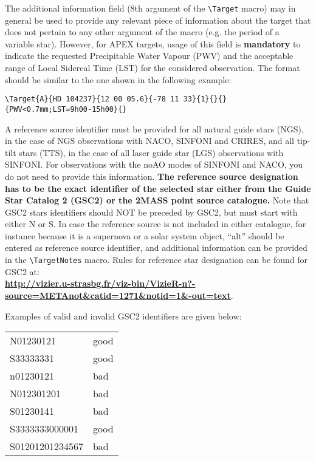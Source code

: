 \documentclass{article}
\begin{document}
The additional information field (8th argument of the \verb|\Target|
macro) may in general be used to provide any relevant piece of
information about the target that does not pertain to any other
argument of the macro (e.g. the period of a variable star). However,
for APEX targets, usage of this field is {\bf mandatory} to indicate the
requested Precipitable Water Vapour (PWV) and the acceptable range of
Local Sidereal Time (LST) for the considered observation. The format
should be similar to the one shown in the following example:
\begin{verbatim}
\Target{A}{HD 104237}{12 00 05.6}{-78 11 33}{1}{}{}{PWV<0.7mm;LST=9h00-15h00}{}
\end{verbatim}

A reference source identifier must be provided for all natural guide stars
(NGS), in the case of NGS observations with NACO, SINFONI and CRIRES,
and all tip-tilt stars (TTS), in the case of all laser guide star (LGS)
observations with SINFONI. For observations with the noAO modes of SINFONI and NACO,
you do not need to provide this information.  {\bf The reference source
  designation has to be the exact identifier of the selected star
  either 
  from the Guide Star Catalog 2 (GSC2) or the 2MASS point source
  catalogue.} Note that GSC2 stars identifiers should NOT be preceded
by GSC2, 
but must start with either N or S. In case the reference source is not
included in either catalogue, for instance because it is a supernova or
a solar system object, ``alt'' should be entered as reference source
identifier, and additional information can be provided in the
\verb|\TargetNotes| macro.
Rules for reference star designation can be found for GSC2 at:\\
  \href{http://vizier.u-strasbg.fr/viz-bin/VizieR-n?-source=METAnot&catid=1271&notid=1&-out=text}{\bf
    \underline{http://vizier.u-strasbg.fr/viz-bin/VizieR-n?-source=METAnot\&catid=1271\&notid=1\&-out=text}}. 

\smallskip

Examples of valid and invalid GSC2 identifiers are given below:

\begin{center}
\begin{tabular}{ll}
    N01230121           & good\\
    S33333331           & good\\
    n01230121           & bad\\
    N012301201          & bad\\
    S01230141           & bad\\
    S3333333000001      & good\\
    S01201201234567     & bad\\
\end{tabular}
\end{center}
\end{document}

